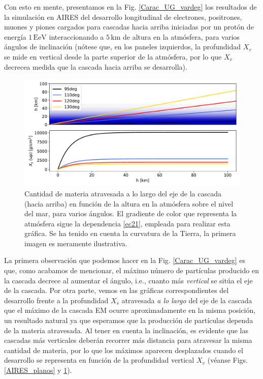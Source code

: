 \documentclass[11 pt, a4paper]{article} %
\numberwithin{equation}{section}
\numberwithin{figure}{section}
\numberwithin{table}{section}
\begin{document}
	Con esto en mente, presentamos en la Fig. \ref{Carac_UG_vardeg} los resultados de la simulación en AIRES del desarrollo longitudinal de electrones, positrones, muones y piones cargados para cascadas hacia arriba iniciadas por un protón de energía $1\,\mathrm{EeV}$ interaccionando a $5\,\mathrm{km}$ de altura en la atmósfera, para varios ángulos de inclinación (nótese que, en los paneles izquierdos, la profundidad $X_v$ se mide en vertical desde la parte superior de la atmósfera, por lo que $X_v$ decrecea medida que la cascada hacia arriba se desarrolla).
	\begin{figure}[H]
		\centering
		\includegraphics[width=.7\linewidth]{figures/cascadas/Profatravesadavsang}
		\caption{Cantidad de materia atravesada a lo largo del eje de la cascada (hacia arriba) en función de la altura en la atmósfera sobre el nivel del mar, para varios ángulos. El gradiente de color que representa la atmósfera sigue la dependencia \eqref{ec21}, empleada para realizar esta gráfica. Se ha tenido en cuenta la curvatura de la Tierra, la primera imagen es meramente ilustrativa.}
		\label{Profatravesadavsang}
	\end{figure}

La primera observación que podemos hacer en la Fig. \ref{Carac_UG_vardeg} es que, como acabamos de mencionar, el máximo número de partículas producido en la cascada decrece al aumentar el ángulo, i.e., cuanto más \textit{vertical} se sitúa el eje de la cascada. Por otra parte, vemos en las gráficas correspondientes del desarrollo frente a la profundidad $X_s$ atravesada \textit{a lo largo} del eje de la cascada que el máximo de la cascada EM ocurre aproximadamente en la misma posición, un resultado natural ya que esperamos que la producción de partículas dependa de la materia atravesada. Al tener en cuenta la inclinación, es evidente que las cascadas más verticales deberán recorrer más distancia para atravesar la misma cantidad de materia, por lo que los máximos aparecen desplazados cuando el desarrollo se representa en función de la profundidad vertical $X_v$ (véanse Figs. \ref{AIRES_planos} y \ref{Profatravesadavsang}). 
\end{document}
